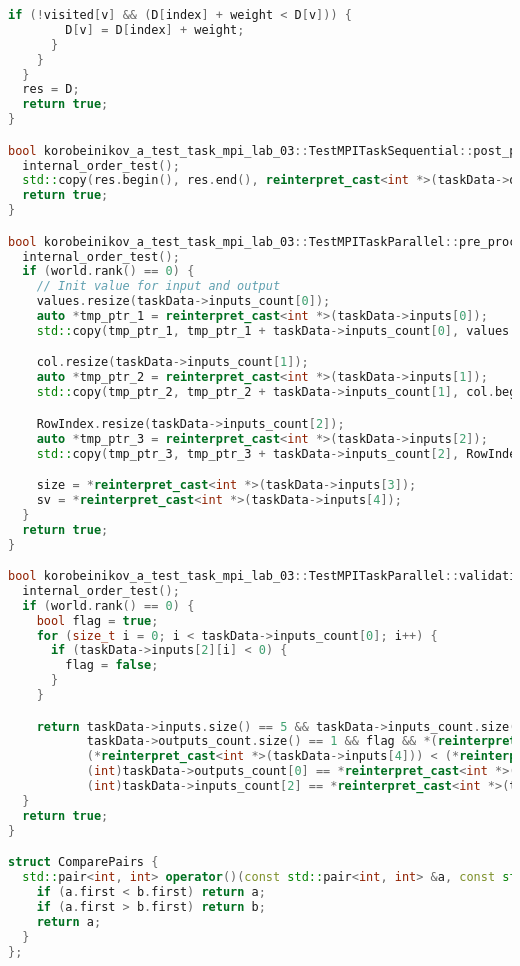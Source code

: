 \documentclass[12pt]{article}
\begin{document}
\begin{lstlisting}[language=C++]
      if (!visited[v] && (D[index] + weight < D[v])) {
        D[v] = D[index] + weight;
      }
    }
  }
  res = D;
  return true;
}

bool korobeinikov_a_test_task_mpi_lab_03::TestMPITaskSequential::post_processing() {
  internal_order_test();
  std::copy(res.begin(), res.end(), reinterpret_cast<int *>(taskData->outputs[0]));
  return true;
}

bool korobeinikov_a_test_task_mpi_lab_03::TestMPITaskParallel::pre_processing() {
  internal_order_test();
  if (world.rank() == 0) {
    // Init value for input and output
    values.resize(taskData->inputs_count[0]);
    auto *tmp_ptr_1 = reinterpret_cast<int *>(taskData->inputs[0]);
    std::copy(tmp_ptr_1, tmp_ptr_1 + taskData->inputs_count[0], values.begin());

    col.resize(taskData->inputs_count[1]);
    auto *tmp_ptr_2 = reinterpret_cast<int *>(taskData->inputs[1]);
    std::copy(tmp_ptr_2, tmp_ptr_2 + taskData->inputs_count[1], col.begin());

    RowIndex.resize(taskData->inputs_count[2]);
    auto *tmp_ptr_3 = reinterpret_cast<int *>(taskData->inputs[2]);
    std::copy(tmp_ptr_3, tmp_ptr_3 + taskData->inputs_count[2], RowIndex.begin());

    size = *reinterpret_cast<int *>(taskData->inputs[3]);
    sv = *reinterpret_cast<int *>(taskData->inputs[4]);
  }
  return true;
}

bool korobeinikov_a_test_task_mpi_lab_03::TestMPITaskParallel::validation() {
  internal_order_test();
  if (world.rank() == 0) {
    bool flag = true;
    for (size_t i = 0; i < taskData->inputs_count[0]; i++) {
      if (taskData->inputs[2][i] < 0) {
        flag = false;
      }
    }

    return taskData->inputs.size() == 5 && taskData->inputs_count.size() == 5 && taskData->outputs.size() == 1 &&
           taskData->outputs_count.size() == 1 && flag && *(reinterpret_cast<int *>(taskData->inputs[4])) >= 0 &&
           (*reinterpret_cast<int *>(taskData->inputs[4])) < (*reinterpret_cast<int *>(taskData->inputs[3])) &&
           (int)taskData->outputs_count[0] == *reinterpret_cast<int *>(taskData->inputs[3]) &&
           (int)taskData->inputs_count[2] == *reinterpret_cast<int *>(taskData->inputs[3]) + 1;
  }
  return true;
}

struct ComparePairs {
  std::pair<int, int> operator()(const std::pair<int, int> &a, const std::pair<int, int> &b) const {
    if (a.first < b.first) return a;
    if (a.first > b.first) return b;
    return a;
  }
};


\end{lstlisting}
\end{document}
